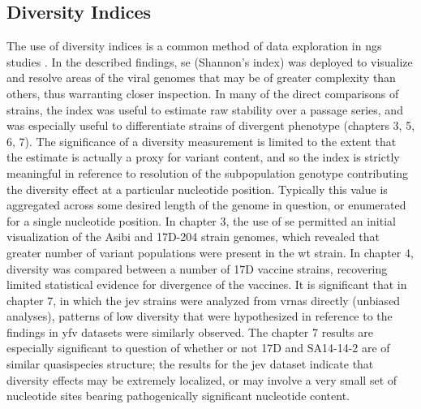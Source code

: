 \subsection{Diversity Indices}
The use of diversity indices is a common method of data exploration in \gls{ngs} studies \parencite{Nishijima:2012ew,Beck:2014cm}. In the described findings, \gls{se} (Shannon’s index) was deployed to visualize and resolve areas of the viral genomes that may be of greater complexity than others, thus warranting closer inspection.  In many of the direct comparisons of strains, the index was useful to estimate raw stability over a passage series, and was especially useful to differentiate strains of divergent phenotype (chapters 3, 5, 6, 7). The significance of a diversity measurement is limited to the extent that the estimate is actually a proxy for variant content, and so the index is strictly meaningful in reference to resolution of the subpopulation genotype contributing the diversity effect at a particular nucleotide position. Typically this value is aggregated across some desired length of the genome in question, or enumerated for a single nucleotide position. In chapter 3, the use of \gls{se} permitted an initial visualization of the Asibi and 17D-204 strain genomes, which revealed that greater number of variant populations were present in the \gls{wt} strain. In chapter 4, diversity was compared between a number of 17D vaccine strains, recovering limited statistical evidence for divergence of the vaccines. It is significant that in chapter 7, in which the \gls{jev} strains were analyzed from \glspl{vrna} directly (unbiased analyses), patterns of low diversity that were hypothesized in reference to the findings in \gls{yfv} datasets were similarly observed. The chapter 7 results are especially significant to question of whether or not 17D and SA14-14-2 are of similar quasispecies structure; the results for the \gls{jev} dataset indicate that diversity effects may be extremely localized, or may involve a very small set of nucleotide sites bearing pathogenically significant nucleotide content.
